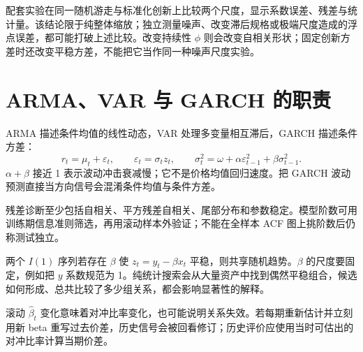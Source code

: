 配套实验在同一随机游走与标准化创新上比较两个尺度，显示系数误差、残差与统计量。该结论限于纯整体缩放；独立测量噪声、改变滞后规格或极端尺度造成的浮点误差，都可能打破上述比较。改变持续性 $\phi$ 则会改变自相关形状；固定创新方差时还改变平稳方差，不能把它当作同一种噪声尺度实验。

\section{ARMA、VAR 与 GARCH 的职责}

ARMA 描述条件均值的线性动态，VAR 处理多变量相互滞后，GARCH 描述条件方差：
\[
r_t=\mu_t+\varepsilon_t,\qquad
\varepsilon_t=\sigma_tz_t,\qquad
\sigma_t^2=\omega+\alpha\varepsilon_{t-1}^2+\beta\sigma_{t-1}^2.
\]
$\alpha+\beta$ 接近 1 表示波动冲击衰减慢；它不是价格均值回归速度。把 GARCH 波动预测直接当方向信号会混淆条件均值与条件方差。

残差诊断至少包括自相关、平方残差自相关、尾部分布和参数稳定。模型阶数可用训练期信息准则筛选，再用滚动样本外验证；不能在全样本 ACF 图上挑阶数后仍称测试独立。


两个 $I(1)$ 序列若存在 $\beta$ 使 $z_t=y_t-\beta x_t$ 平稳，则共享随机趋势。$\beta$ 的尺度要固定，例如把 $y$ 系数规范为 1。纯统计搜索会从大量资产中找到偶然平稳组合，候选如何形成、总共比较了多少组关系，都会影响显著性的解释。

滚动 $\hat\beta_t$ 变化意味着对冲比率变化，也可能说明关系失效。若每期重新估计并立刻用新 beta 重写过去价差，历史信号会被回看修订；历史评价应使用当时可估出的对冲比率计算当期价差。
